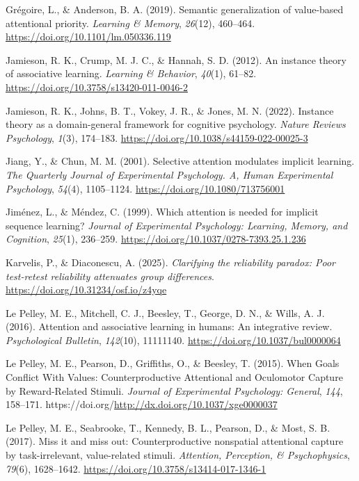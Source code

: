 \documentclass[
  man,
  floatsintext,
  longtable,
  nolmodern,
  notxfonts,
  notimes,
  colorlinks=true,linkcolor=blue,citecolor=blue,urlcolor=blue]{apa7}
\newlength{\cslhangindent}
\newenvironment{CSLReferences}[2] %
 {\begin{list}{}{%
  \setlength{\itemindent}{0pt}
  \setlength{\leftmargin}{0pt}
  \setlength{\parsep}{0pt}
  \ifodd #1
   \setlength{\leftmargin}{\cslhangindent}
   \setlength{\itemindent}{-1\cslhangindent}
  \fi
  \setlength{\itemsep}{#2\baselineskip}}}
 {\end{list}}
\begin{document}
\begin{CSLReferences}{1}{0}
Grégoire, L., \& Anderson, B. A. (2019). Semantic generalization of
value-based attentional priority. \emph{Learning \& Memory},
\emph{26}(12), 460--464. \url{https://doi.org/10.1101/lm.050336.119}

Jamieson, R. K., Crump, M. J. C., \& Hannah, S. D. (2012). An instance
theory of associative learning. \emph{Learning \& Behavior},
\emph{40}(1), 61--82. \url{https://doi.org/10.3758/s13420-011-0046-2}

Jamieson, R. K., Johns, B. T., Vokey, J. R., \& Jones, M. N. (2022).
Instance theory as a domain-general framework for cognitive psychology.
\emph{Nature Reviews Psychology}, \emph{1}(3), 174--183.
\url{https://doi.org/10.1038/s44159-022-00025-3}

Jiang, Y., \& Chun, M. M. (2001). Selective attention modulates implicit
learning. \emph{The Quarterly Journal of Experimental Psychology. A,
Human Experimental Psychology}, \emph{54}(4), 1105--1124.
\url{https://doi.org/10.1080/713756001}

Jiménez, L., \& Méndez, C. (1999). Which attention is needed for
implicit sequence learning? \emph{Journal of Experimental Psychology:
Learning, Memory, and Cognition}, \emph{25}(1), 236--259.
\url{https://doi.org/10.1037/0278-7393.25.1.236}

Karvelis, P., \& Diaconescu, A. (2025). \emph{Clarifying the reliability
paradox: Poor test-retest reliability attenuates group differences}.
\url{https://doi.org/10.31234/osf.io/z4yqe}

Le Pelley, M. E., Mitchell, C. J., Beesley, T., George, D. N., \& Wills,
A. J. (2016). Attention and associative learning in humans: An
integrative review. \emph{Psychological Bulletin}, \emph{142}(10),
11111140. \url{https://doi.org/10.1037/bul0000064}

Le Pelley, M. E., Pearson, D., Griffiths, O., \& Beesley, T. (2015).
When Goals Conflict With Values: Counterproductive Attentional and
Oculomotor Capture by Reward-Related Stimuli. \emph{Journal of
Experimental Psychology: General}, \emph{144}, 158--171.
https://doi.org/\url{http://dx.doi.org/10.1037/xge0000037}

Le Pelley, M. E., Seabrooke, T., Kennedy, B. L., Pearson, D., \& Most,
S. B. (2017). Miss it and miss out: Counterproductive nonspatial
attentional capture by task-irrelevant, value-related stimuli.
\emph{Attention, Perception, \& Psychophysics}, \emph{79}(6),
1628--1642. \url{https://doi.org/10.3758/s13414-017-1346-1}


\end{CSLReferences}
\end{document}
